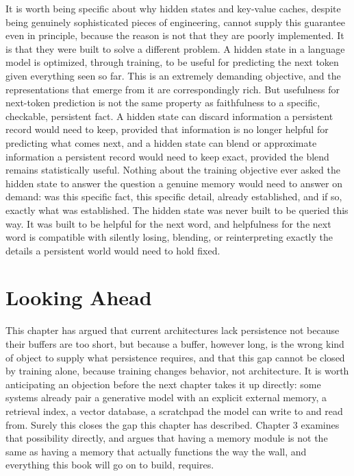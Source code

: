 It is worth being specific about why hidden states and key-value caches, despite being genuinely sophisticated pieces of engineering, cannot supply this guarantee even in principle, because the reason is not that they are poorly implemented. It is that they were built to solve a different problem. A hidden state in a language model is optimized, through training, to be useful for predicting the next token given everything seen so far. This is an extremely demanding objective, and the representations that emerge from it are correspondingly rich. But usefulness for next-token prediction is not the same property as faithfulness to a specific, checkable, persistent fact. A hidden state can discard information a persistent record would need to keep, provided that information is no longer helpful for predicting what comes next, and a hidden state can blend or approximate information a persistent record would need to keep exact, provided the blend remains statistically useful. Nothing about the training objective ever asked the hidden state to answer the question a genuine memory would need to answer on demand: was this specific fact, this specific detail, already established, and if so, exactly what was established. The hidden state was never built to be queried this way. It was built to be helpful for the next word, and helpfulness for the next word is compatible with silently losing, blending, or reinterpreting exactly the details a persistent world would need to hold fixed.

\section{Looking Ahead}

This chapter has argued that current architectures lack persistence not because their buffers are too short, but because a buffer, however long, is the wrong kind of object to supply what persistence requires, and that this gap cannot be closed by training alone, because training changes behavior, not architecture. It is worth anticipating an objection before the next chapter takes it up directly: some systems already pair a generative model with an explicit external memory, a retrieval index, a vector database, a scratchpad the model can write to and read from. Surely this closes the gap this chapter has described. Chapter 3 examines that possibility directly, and argues that having a memory module is not the same as having a memory that actually functions the way the wall, and everything this book will go on to build, requires.
